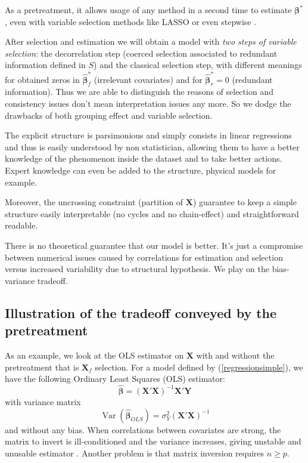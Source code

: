\documentclass[11pt,a4paper]{article}
\begin{document}
As a pretreatment, it allows usage of any method in a second time to estimate $\boldsymbol{\beta}^*$, even with variable selection methods like LASSO or even stepwise \cite{seber2012linear}.

After selection and estimation we will obtain a model with { \it two steps of variable selection}: the decorrelation step (coerced selection associated to redundant information defined in $S$) and the classical selection step, with different meanings for obtained zeros in $\hat{\boldsymbol{\beta}}^*_f$ (irrelevant covariates) and for $\hat{\boldsymbol{\beta}}^*_r=0$ (redundant information). 
 Thus we are able to distinguish the reasons of selection and consistency issues don't mean interpretation issues any more. So we dodge the drawbacks of both grouping effect and variable selection.


The explicit structure is parsimonious and simply consists in linear regressions and thus is easily understood by non statistician, allowing them to have a better knowledge of the phenomenon inside the dataset and to take better actions. Expert knowledge can even be added to the structure, physical models for example.

Moreover, the uncrossing constraint (partition of $\boldsymbol{X}$) guarantee to keep a simple structure easily interpretable (no cycles and no chain-effect) and straightforward readable.

	
			There is no theoretical guarantee that our model is better. It's just a compromise between numerical issues caused by correlations for estimation and selection versus increased variability due to structural hypothesis. We play on the bias-variance tradeoff.
			 
	\subsection{Illustration of the tradeoff conveyed by the pretreatment}	
	As an example, we look at the OLS estimator on $\boldsymbol{X}$ with and without the pretreatment that is $\boldsymbol{X}_f$ selection.
For a model defined by (\ref{regressionsimple}), we have the following Ordinary Least Squares (\textsc{OLS}) estimator:
	\begin{equation}
		\boldsymbol{\hat{\beta}}=\left(\boldsymbol{X}'\boldsymbol{X} \right) ^{-1}\boldsymbol{X}'\boldsymbol{Y}
	\end{equation}
	with variance matrix
	\begin{equation}
		\operatorname{Var}(\hat{\boldsymbol{\beta}}_{OLS})=\sigma_Y^2\left(\boldsymbol{X}'\boldsymbol{X} \right) ^{-1} \label{eqOLS}
	\end{equation}
	and without any bias.
	When correlations between covariates are strong, the matrix to invert is ill-conditioned and the variance increases, giving unstable and unusable estimator \cite{hoerl1970ridge}.
	Another problem is that matrix inversion requires $n\geq p$. 	
		  
\end{document}

